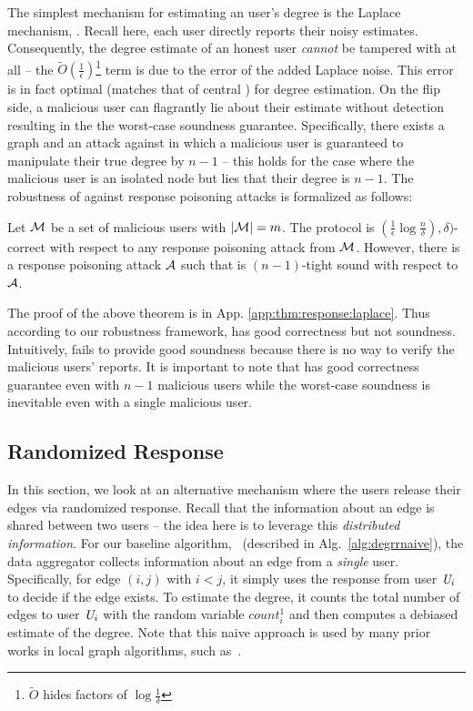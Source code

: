 The simplest mechanism for estimating an user's degree is the Laplace mechanism, \RLap. Recall here, each user directly reports their noisy estimates. Consequently, the degree estimate of an honest user \textit{cannot} be tampered with at all -- the $\tilde{O}(\frac{1}{\epsilon})$\footnote{$\tilde{O}$ hides factors of $\log\frac{1}{\delta}$ } term is due to the error of the added Laplace noise. This error is in fact optimal (matches that of central \DP) for degree estimation.  On the flip side, a malicious user can flagrantly lie about their estimate without detection resulting in the the worst-case soundness guarantee. Specifically,  there
exists a graph and an attack against \RLap{} in
which a malicious user is guaranteed to manipulate their true degree by $n -1$ --
this holds for the case where the malicious user is an isolated node but
lies that their degree is $n - 1$. The robustness of \RLap{} against response poisoning attacks is formalized as follows: 
\begin{thm}\label{thm:response:laplace}
	Let $\mathcal{M}$ be a set of malicious users with $|\mathcal{M}| = m$. The \RLap{} protocol is $(\frac{1}{\epsilon}\log\frac{n}{\delta}),\delta)$-correct with respect to any response poisoning attack from $\mathcal{M}$. However, there is a response poisoning attack $\mathcal{A}$ such that \RLap{} is $(n-1)$-tight sound with respect to $\mathcal{A}$.
\end{thm}
The proof of the above theorem is in App. \ref{app:thm:response:laplace}.
Thus according to our robustness framework, \RLap{} has good correctness but not soundness. Intuitively, \RLap{} fails to provide good soundness because there is no way to verify the malicious users' reports. 
It is important to note that  \RLap{} has good correctness guarantee even with $n-1$ malicious users while the worst-case soundness is inevitable even with a single malicious user. 
\subsection{Randomized Response}\label{sec:protocol:naive}
In this section, we look at an alternative mechanism where the users release their edges via randomized response. Recall that the information about an edge is shared between two users -- the idea here is to leverage this \textit{distributed information}. For our baseline algorithm, \DegRRNaive~(described in Alg.~\ref{alg:degrrnaive}), the data aggregator collects information about an edge from a \textit{single} user. Specifically, for edge $(i,j)$ with $i < j$, it simply uses the response from user $\textit{U}_i$ to decide if the edge exists. To estimate the degree, it counts the total number of edges to user $\textit{U}_i$ with the random variable $count_i^1$ and then computes a debiased estimate of the degree. Note that this naive approach is used by many prior works in local graph algorithms, such as~\cite{LDPGraph1, LDPGraph2,imola2021locally,imola_communication-efficient_2022}.
\setlength{\textfloatsep}{4pt}

